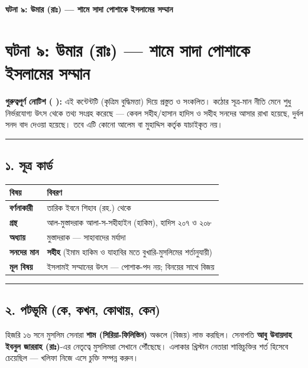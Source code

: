 

\begin{center}{\Large\bfseries\color{emerald} ঘটনা ৯: উমার (রাঃ) — শামে সাদা পোশাকে ইসলামের সম্মান}\end{center}
\vspace{1em}
\section*{ঘটনা ৯: উমার (রাঃ) — শামে সাদা পোশাকে ইসলামের সম্মান}

\begin{warnbox}
 \textbf{গুরুত্বপূর্ণ নোটিশ ( ):} এই কন্টেন্টটি  (কৃত্রিম বুদ্ধিমত্তা) দিয়ে প্রস্তুত ও সংকলিত।  কঠোর সূত্র-মান নীতি মেনে শুধু নির্ভরযোগ্য উৎস থেকে তথ্য সংগ্রহ করেছে — কেবল সহীহ/হাসান হাদিস ও সহীহ সনদের আসার রাখা হয়েছে, দুর্বল সনদ বাদ দেওয়া হয়েছে। তবে এটি কোনো আলেম বা মুহাদ্দিস কর্তৃক যাচাইকৃত নয়।
\end{warnbox}


\medskip\hrule\medskip

\subsection*{১. সূত্র কার্ড}

\begin{table}[h]\centering\small
\begin{tabular}{ll}
বিষয় & বিবরণ \\
\hline
\textbf{বর্ণনাকারী} & তারিক ইবনে শিহাব (রহ.) থেকে \\
\textbf{গ্রন্থ} & আল-মুস্তাদরাক আলা-স-সহীহাইন (হাকিম), হাদিস ২০৭ ও ২০৮ \\
\textbf{অধ্যায়} & মুস্তাদরাক — সাহাবাদের মর্যাদা \\
\textbf{সনদের মান} & \textbf{সহীহ} (ইমাম হাকিম ও যাহাবির মতে বুখারি-মুসলিমের শর্তানুযায়ী) \\
\textbf{মূল বিষয়} & ইসলামই সম্মানের উৎস — পোশাক-পদ নয়; বিনয়ের সাথে বিজয় \\
\hline
\end{tabular}
\end{table}

\medskip\hrule\medskip

\subsection*{২. পটভূমি (কে, কখন, কোথায়, কেন)}

হিজরি ১৬ সনে মুসলিম সেনারা \textbf{শাম (সিরিয়া-ফিলিস্তিন)} অঞ্চলে  (বিজয়) লাভ করছিল। সেনাপতি \textbf{আবু উবায়দাহ ইবনুল জাররাহ (রাঃ)}-এর নেতৃত্বে মুসলিমরা সেখানে পৌঁছেছে। এলাকার খ্রিস্টান নেতারা শান্তিচুক্তির শর্ত হিসেবে চেয়েছিল — খলিফা নিজে এসে চুক্তি সম্পন্ন করুন।

